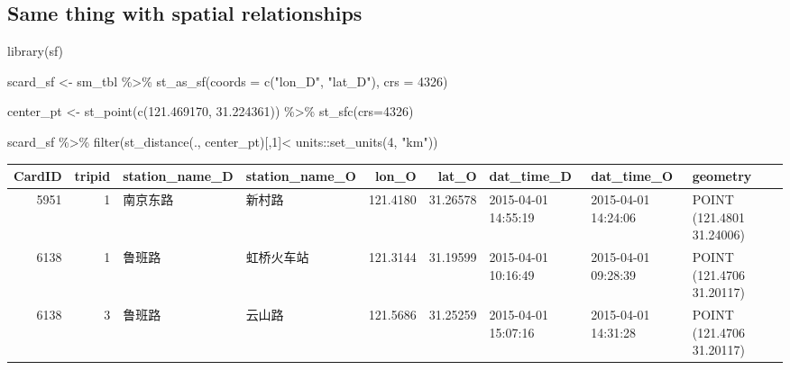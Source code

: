 \documentclass[
  a4paper,
  DIV=11,
  numbers=noendperiod]{scrartcl}
\newenvironment{Shaded}{\begin{snugshade}}{\end{snugshade}}
\newcommand{\AttributeTok}[1]{\textcolor[rgb]{0.40,0.45,0.13}{#1}}
\newcommand{\DecValTok}[1]{\textcolor[rgb]{0.68,0.00,0.00}{#1}}
\newcommand{\FloatTok}[1]{\textcolor[rgb]{0.68,0.00,0.00}{#1}}
\newcommand{\FunctionTok}[1]{\textcolor[rgb]{0.28,0.35,0.67}{#1}}
\newcommand{\NormalTok}[1]{\textcolor[rgb]{0.00,0.23,0.31}{#1}}
\newcommand{\OtherTok}[1]{\textcolor[rgb]{0.00,0.23,0.31}{#1}}
\newcommand{\SpecialCharTok}[1]{\textcolor[rgb]{0.37,0.37,0.37}{#1}}
\newcommand{\StringTok}[1]{\textcolor[rgb]{0.13,0.47,0.30}{#1}}
\begin{document}
\hypertarget{same-thing-with-spatial-relationships}{%
\subsection{Same thing with spatial
relationships}\label{same-thing-with-spatial-relationships}}

\begin{Shaded}
\begin{Highlighting}[]
\FunctionTok{library}\NormalTok{(sf)}

\NormalTok{scard\_sf }\OtherTok{\textless{}{-}} 
\NormalTok{    sm\_tbl }\SpecialCharTok{\%\textgreater{}\%}
    \FunctionTok{st\_as\_sf}\NormalTok{(}\AttributeTok{coords =} \FunctionTok{c}\NormalTok{(}\StringTok{"lon\_D"}\NormalTok{, }\StringTok{"lat\_D"}\NormalTok{), }\AttributeTok{crs =} \DecValTok{4326}\NormalTok{) }

\NormalTok{center\_pt }\OtherTok{\textless{}{-}} 
    \FunctionTok{st\_point}\NormalTok{(}\FunctionTok{c}\NormalTok{(}\FloatTok{121.469170}\NormalTok{, }\FloatTok{31.224361}\NormalTok{)) }\SpecialCharTok{\%\textgreater{}\%} 
    \FunctionTok{st\_sfc}\NormalTok{(}\AttributeTok{crs=}\DecValTok{4326}\NormalTok{)}

\NormalTok{scard\_sf }\SpecialCharTok{\%\textgreater{}\%}
    \FunctionTok{filter}\NormalTok{(}\FunctionTok{st\_distance}\NormalTok{(., center\_pt)[,}\DecValTok{1}\NormalTok{]}\SpecialCharTok{\textless{}}\NormalTok{ units}\SpecialCharTok{::}\FunctionTok{set\_units}\NormalTok{(}\DecValTok{4}\NormalTok{, }\StringTok{"km"}\NormalTok{))}
\end{Highlighting}
\end{Shaded}

\begin{table}
\centering
\begin{tabular}{r|r|l|l|r|r|l|l|l}
\hline
CardID & tripid & station\_name\_D & station\_name\_O & lon\_O & lat\_O & dat\_time\_D & dat\_time\_O & geometry\\
\hline
5951 & 1 & 南京东路 & 新村路 & 121.4180 & 31.26578 & 2015-04-01 14:55:19 & 2015-04-01 14:24:06 & POINT (121.4801 31.24006)\\
\hline
6138 & 1 & 鲁班路 & 虹桥火车站 & 121.3144 & 31.19599 & 2015-04-01 10:16:49 & 2015-04-01 09:28:39 & POINT (121.4706 31.20117)\\
\hline
6138 & 3 & 鲁班路 & 云山路 & 121.5686 & 31.25259 & 2015-04-01 15:07:16 & 2015-04-01 14:31:28 & POINT (121.4706 31.20117)\\
\hline
\end{tabular}
\end{table}
\end{document}
